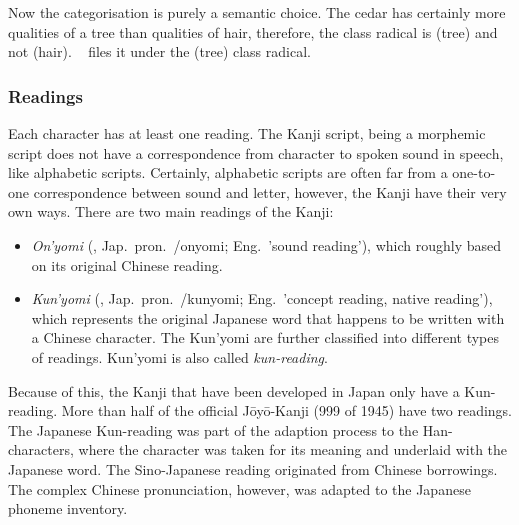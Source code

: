 Now the categorisation is purely a semantic choice. The cedar has certainly more
qualities of a tree than qualities of hair, therefore, the class radical is
 (tree) and not  (hair). 
~\citeyear{Hadamitzky1995} files it under the 
 (tree) class radical. %


\subsubsection{Readings}
\label{sec:readings}

Each character has at least one reading. The Kanji script, being a morphemic 
script does not have a correspondence from character to spoken sound in speech,
like alphabetic scripts. Certainly, alphabetic scripts are often far from a 
one-to-one correspondence between sound and letter, however, the Kanji have 
their very own ways. There are two main readings of the Kanji: \\ 
\begin{itemize}
  \item \emph{On'yomi} (, Jap.~pron.~/onyomi; 
        Eng.~'sound reading'), which roughly based on its original Chinese 
        reading.

  \item \emph{Kun'yomi} (, Jap.~pron.~/kunyomi; 
        Eng.~'concept reading, native reading'), which represents the original 
        Japanese word that happens to be written with a Chinese character. 
        The Kun'yomi are further classified into different types of readings.
        Kun'yomi is also called \emph{kun-reading}.
\end{itemize}
Because of this, the Kanji that have been developed in Japan only have a 
Kun-reading. More than half of the official Jōyō-Kanji (999 of 1945)
have two readings.
The Japanese Kun-reading was part of the adaption process to the Han-characters,
where the character was taken for its meaning and underlaid with the Japanese
word. The Sino-Japanese reading originated from Chinese borrowings. The 
complex Chinese pronunciation, however, was adapted to the Japanese 
phoneme inventory.

